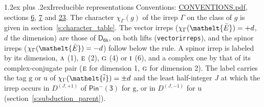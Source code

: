 \documentclass[10pt,a4paper]{article}
\makeatletter
\renewcommand\section{\@startsection{section}{1}{\z@}{-3ex plus -1ex minus -.2ex}%
  {1.2ex plus .2ex}{\normalfont\large\sffamily\bfseries\color{parttitle}}}
\numberwithin{equation}{section}
\newcommand{\eltfont}[1]{{\let\sigma\eltsigma\mathelt{#1}}}
\newcommand{\grp}[1]{\mathsf{#1}}
\newcommand{\irr}[1]{\text{\normalfont\scshape #1}}
\newcommand{\elt}[1]{\eltfont{#1}}
\newcommand{\ptag}[1]{\mathrm{#1}}
\newcommand{\irrJp}[2]{D^{(#1,#2)}}
\newcommand{\irchar}[1]{\chi_{#1}}
\newcommand{\barred}[1]{\bar{#1}}
\newcommand{\lift}[1]{\tilde{#1}}
\makeatother
\begin{document}
\section{Irreducible representations}\label{s:irreps}
Conventions: \href{../../CONVENTIONS.pdf}{CONVENTIONS.pdf}, sections \href{../../../rotation/CONVENTIONS.pdf\#conv.6}{6}, \href{../../../rotation/CONVENTIONS.pdf\#conv.7}{7} and \href{../../CONVENTIONS.pdf\#conv.23}{23}.
\leavevmode\label{n:function.character}\label{n:irrep.Gamma}The character $\irchar{\Gamma}(g)$ of the irrep $\Gamma$ on the class of $g$ is given in section~\ref{s:character_table}. \label{n:index.dimension}The vector irreps ($\irchar{\Gamma}(\elt{\barred{E}}) = +d$, $d$ the dimension) are those of \href{../../../rotation/data/pdf/D6h.pdf}{$\grp{D_{6h}}$}, on both lifts (\texttt{vectorirreps}), and the spinor irreps ($\irchar{\Gamma}(\elt{\barred{E}}) = -d$) follow below the rule. A spinor irrep is labeled by its dimension, $\irr{a}$ (1), $\irr{e}$ (2), $\irr{g}$ (4) or $\irr{i}$ (6), and a complex one by that of its complex-conjugate pair ($\irr{e}$ for dimension 1, $\irr{g}$ for dimension 2). The label carries the tag $\ptag{g}$ or $\ptag{u}$ of $\irchar{\Gamma}(\elt{\lift{i}}) = \pm d$ and the least half-integer $J$ at which the irrep occurs in $\irrJp{J}{+1}$ of $\grp{Pin^{-}(3)}$ for $\ptag{g}$, or in $\irrJp{J}{-1}$ for $\ptag{u}$ (section~\ref{s:subduction_parent}).
\end{document}
